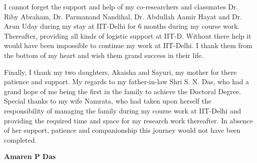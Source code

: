 I cannot forget the support and help of my co-researchers and classmates Dr. Riby Abraham, Dr. Parmanand Nandihal, Dr. Abdullah Aamir Hayat and Dr. Arun Uday during my stay at IIT-Delhi for 6 months during  my course work. Thereafter, providing all kinds of logistic support at IIT-D. Without there help it would have been impossible to continue my work at IIT-Delhi. I thank them from the bottom of my heart and wish them grand success  in their life.


Finally, I thank my two daughters, Akaisha and Sayuri, my mother for there patience  and support. My regards to my father-in-law Shri S. N. Das, who had a grand hope of me being the first in the family to achieve the Doctoral Degree. Special thanks to my wife Namrata, who had taken upon herself  the responsibility of managing the family during my course work at IIT-Delhi and providing the required time and space for my research work thereafter. In absence of  her support, patience and companionship this journey would not have been completed.  



\bigskip
\bigskip
\bigskip
\bigskip

\hfill \textbf{Amaren P Das}

\restoregeometry
